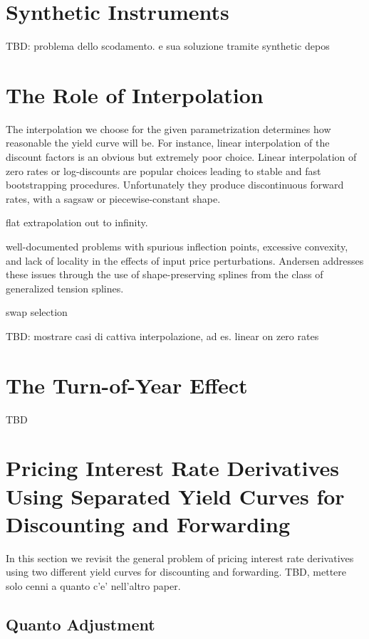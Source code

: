 \documentclass[11pt,reqno]{amsart}
\begin{document}
\section{\label{SecSynt}Synthetic Instruments}

TBD:
problema dello scodamento. e sua soluzione tramite synthetic depos


\section{\label{SecInterp}The Role of Interpolation}
The interpolation we choose for the given parametrization determines how reasonable the yield curve will be. For instance, linear interpolation of the discount factors is an obvious but extremely poor choice. Linear interpolation of zero rates or log-discounts are popular choices leading to stable and fast bootstrapping procedures. Unfortunately they produce discontinuous forward rates, with a sagsaw or piecewise-constant shape.

flat extrapolation out to infinity.

well-documented problems with spurious inflection points, excessive convexity, and lack of locality in the effects of input price perturbations. Andersen \cite{Andersen2005} addresses these issues through the use of shape-preserving splines from the class of generalized tension splines.

swap selection

TBD: mostrare casi di cattiva interpolazione, ad es. linear on zero rates


\section{\label{SecTOY}The Turn-of-Year Effect}
TBD

\section{\label{SecPricing}Pricing Interest Rate Derivatives Using Separated Yield Curves for
Discounting and Forwarding}
In this section we revisit the general problem of pricing interest rate derivatives using two different yield curves for discounting and forwarding.
TBD, mettere solo cenni a quanto c'e' nell'altro paper.


\subsection{Quanto Adjustment}
\end{document}
